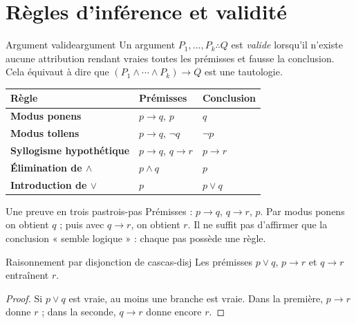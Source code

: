 \section{Règles d'inférence et validité}
\begin{definition}{Argument valide}{argument}
Un argument $P_1,\ldots,P_k\therefore Q$ est \emph{valide} lorsqu'il n'existe aucune attribution rendant vraies toutes les prémisses et fausse la conclusion. Cela équivaut à dire que $(P_1\wedge\cdots\wedge P_k)\to Q$ est une tautologie.
\end{definition}
\begin{center}\renewcommand{\arraystretch}{1.3}
\begin{tabularx}{\textwidth}{>{\bfseries}l X X}\toprule
Règle&Prémisses&Conclusion\\\midrule
Modus ponens&$p\to q$, $p$&$q$\\
Modus tollens&$p\to q$, $\neg q$&$\neg p$\\
Syllogisme hypothétique&$p\to q$, $q\to r$&$p\to r$\\
Élimination de $\wedge$&$p\wedge q$&$p$\\
Introduction de $\vee$&$p$&$p\vee q$\\\bottomrule
\end{tabularx}\end{center}
\begin{exemple}{Une preuve en trois pas}{trois-pas}
Prémisses : $p\to q$, $q\to r$, $p$. Par modus ponens on obtient $q$ ; puis avec $q\to r$, on obtient $r$. Il ne suffit pas d'affirmer que la conclusion « semble logique » : chaque pas possède une règle.
\end{exemple}
\begin{proposition}{Raisonnement par disjonction de cas}{cas-disj}
Les prémisses $p\vee q$, $p\to r$ et $q\to r$ entraînent $r$.
\end{proposition}
\begin{proof}Si $p\vee q$ est vraie, au moins une branche est vraie. Dans la première, $p\to r$ donne $r$ ; dans la seconde, $q\to r$ donne encore $r$.\end{proof}

